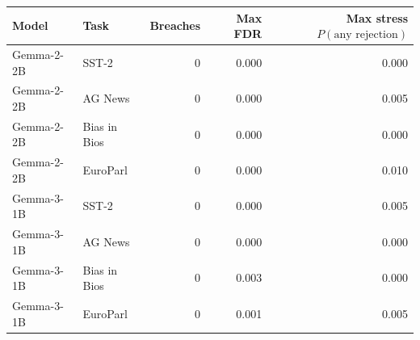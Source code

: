 \begin{tabular}{llrrr}
\toprule
Model & Task & Breaches & Max FDR & Max stress $P(\text{any rejection})$ \\
\midrule
Gemma-2-2B & SST-2 & 0 & 0.000 & 0.000 \\
Gemma-2-2B & AG News & 0 & 0.000 & 0.005 \\
Gemma-2-2B & Bias in Bios & 0 & 0.000 & 0.000 \\
Gemma-2-2B & EuroParl & 0 & 0.000 & 0.010 \\
Gemma-3-1B & SST-2 & 0 & 0.000 & 0.005 \\
Gemma-3-1B & AG News & 0 & 0.000 & 0.000 \\
Gemma-3-1B & Bias in Bios & 0 & 0.003 & 0.000 \\
Gemma-3-1B & EuroParl & 0 & 0.001 & 0.005 \\
\bottomrule
\end{tabular}
